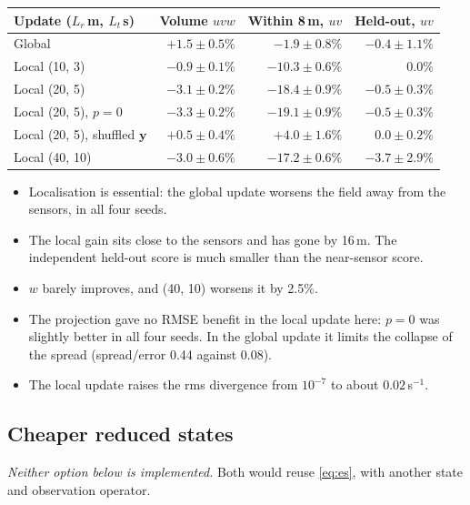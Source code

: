 \documentclass[11pt,a4paper]{article}
\begin{document}
\begin{center}
\begin{tabular}{@{}lrrr@{}}
\toprule
Update ($L_r$\,m, $L_t$\,s) & Volume $uvw$ & Within 8\,m, $uv$ & Held-out, $uv$ \\
\midrule
Global & $+1.5 \pm 0.5\%$ & $-1.9 \pm 0.8\%$ & $-0.4 \pm 1.1\%$ \\
Local (10, 3) & $-0.9 \pm 0.1\%$ & $-10.3 \pm 0.6\%$ & $0.0\%$ \\
Local (20, 5) & $-3.1 \pm 0.2\%$ & $-18.4 \pm 0.9\%$ & $-0.5 \pm 0.3\%$ \\
Local (20, 5), $p = 0$ & $-3.3 \pm 0.2\%$ & $-19.1 \pm 0.9\%$ & $-0.5 \pm 0.3\%$ \\
Local (20, 5), shuffled $\bm y$ & $+0.5 \pm 0.4\%$ & $+4.0 \pm 1.6\%$ & $0.0 \pm 0.2\%$ \\
Local (40, 10) & $-3.0 \pm 0.6\%$ & $-17.2 \pm 0.6\%$ & $-3.7 \pm 2.9\%$ \\
\bottomrule
\end{tabular}
\end{center}

\begin{itemize}
\item Localisation is essential: the global update worsens the field away from
  the sensors, in all four seeds.
\item The local gain sits close to the sensors and has gone by 16\,m. The
  independent held-out score is much smaller than the near-sensor score.
\item $w$ barely improves, and (40, 10) worsens it by 2.5\%.
\item The projection gave no RMSE benefit in the local update here: $p = 0$ was
  slightly better in all four seeds. In the global update it limits the
  collapse of the spread (spread/error 0.44 against 0.08).
\item The local update raises the rms divergence from $10^{-7}$ to about
  $0.02$\,s$^{-1}$.
\end{itemize}

\subsection{Cheaper reduced states}
\emph{Neither option below is implemented.} Both would reuse \eqref{eq:es}, with
another state and observation operator.
\end{document}
